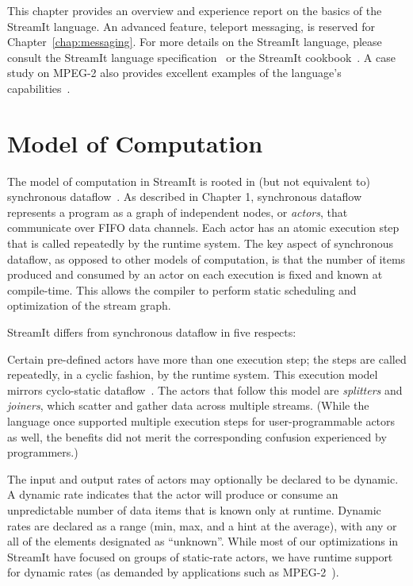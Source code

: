 \label{chap:language}

This chapter provides an overview and experience report on the basics
of the StreamIt language.  An advanced feature, teleport messaging, is
reserved for Chapter~\ref{chap:messaging}.  For more details on
the StreamIt language, please consult the StreamIt language
specification~\cite{streamit-lang-spec} or the StreamIt
cookbook~\cite{streamit-cookbook}.  A case study on MPEG-2 also
provides excellent examples of the language's
capabilities~\cite{drake-ipdps06}.

\section{Model of Computation}

The model of computation in StreamIt is rooted in (but not equivalent
to) synchronous dataflow~\cite{lee_static_1987}.  As described in
Chapter 1, synchronous dataflow represents a program as a graph of
independent nodes, or {\it actors}, that communicate over FIFO data
channels.  Each actor has an atomic execution step that is called
repeatedly by the runtime system.  The key aspect of synchronous
dataflow, as opposed to other models of computation, is that the
number of items produced and consumed by an actor on each execution is
fixed and known at compile-time.  This allows the compiler to perform
static scheduling and optimization of the stream graph.

StreamIt differs from synchronous dataflow in five respects:
\mybegin

  Certain pre-defined actors have
  more than one execution step; the steps are called repeatedly, in a
  cyclic fashion, by the runtime system.  This execution model mirrors
  cyclo-static
  dataflow~\cite{bilsen_cyclo-static_1995,parks_comparison_1995}.  The
  actors that follow this model are {\it splitters} and {\it joiners},
  which scatter and gather data across multiple streams.  (While the
  language once supported multiple execution steps for
  user-programmable actors as well, the benefits did not merit the
  corresponding confusion experienced by programmers.)

  The input and output rates of actors may
  optionally be declared to be dynamic.  A dynamic rate indicates
  that the actor will produce or consume an unpredictable number of
  data items that is known only at runtime.  Dynamic rates are
  declared as a range (min, max, and a hint at the average), with any
  or all of the elements designated as ``unknown''.  While most of our
  optimizations in StreamIt have focused on groups of static-rate
  actors, we have runtime support for dynamic rates (as demanded by
  applications such as MPEG-2~\cite{drake-ipdps06}).

